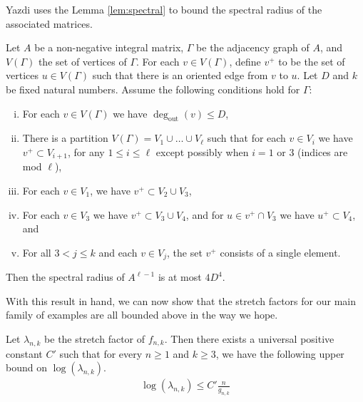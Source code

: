 
Yazdi uses the Lemma \ref{lem:spectral} to bound the spectral radius of the associated matrices.

\begin{lem}
\label{lem:spectral}
Let $A$ be a non-negative integral matrix, $\Gamma$ be the adjacency graph of $A$, and $V(\Gamma)$ the set of
vertices of $\Gamma$. For each $v \in V(\Gamma)$, define $v^+$ to be the set of vertices $u\in V(\Gamma)$ such that there
is an oriented edge from $v$ to $u$. Let $D$ and $k$ be fixed natural numbers. Assume the following conditions
hold for $\Gamma$:
\begin{enumerate}[(i)]
\item For each $v \in V(\Gamma)$ we have $\deg_{\text{out}}(v) \leq D$,
\item There is a partition $V(\Gamma) = V_1 \cup \dots \cup V_\ell$ such that for each $v \in V_i$ we have
  $v^+ \subset V_{i+1}$, for any $1 \leq i \leq \ell$ except possibly when $i = 1$ or 3 (indices are mod $\ell$),
\item For each $v \in V_1$, we have $v^+ \subset V_2 \cup V_3$,
\item For each $v \in V_3$ we have $v^+ \subset V_3 \cup V_4$, and for $u \in v^+ \cap V_3$ we have
  $u^+ \subset V_4$, and 
\item For all $3 < j \leq k$ and each $v \in V_j$, the set $v^+$ consists of a single element.
\end{enumerate}

Then the spectral radius of $A^{\ell-1}$ is at most $4D^4$.

\end{lem}
With this result in hand, we can now show that the stretch factors for our main family of examples are all
bounded above in the way we hope.

\begin{lem}\label{lem:upperbound}
  Let $\lambda_{n,k}$ be the stretch factor of $f_{n,k}$. Then there exists a universal positive constant $C'$ such that for every $n \geq 1$ and $k \geq 3$, we have the following upper bound on $\log(\lambda_{n,k})$.
  \begin{align*}
   \log(\lambda_{n,k}) \leq C'\frac{n}{g_{n,k}}
  \end{align*}
\end{lem}

